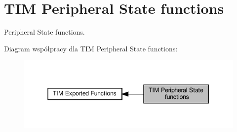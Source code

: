 \hypertarget{group___t_i_m___exported___functions___group10}{}\section{T\+IM Peripheral State functions}
\label{group___t_i_m___exported___functions___group10}


Peripheral State functions.  


Diagram współpracy dla T\+IM Peripheral State functions\+:\nopagebreak
\begin{figure}[H]
\begin{center}
\leavevmode
\includegraphics[width=345pt]{group___t_i_m___exported___functions___group10}
\end{center}
\end{figure}

